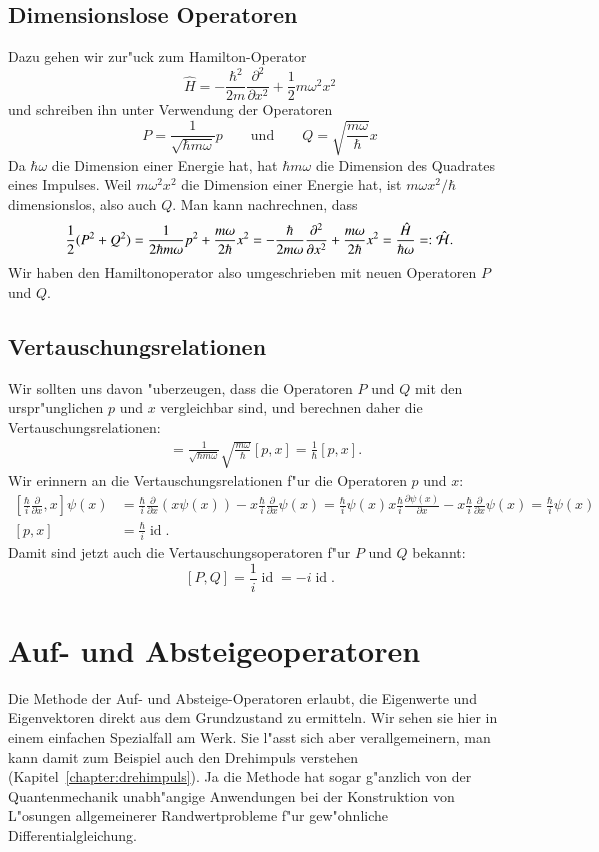 \subsection{Dimensionslose Operatoren}
Dazu gehen wir zur"uck zum Hamilton-Operator
\[
\hat H=-\frac{\hbar^2}{2m}\frac{\partial^2}{\partial x^2}
+\frac12m\omega^2 x^2
\]
und schreiben ihn unter Verwendung der Operatoren
\[
P=\frac{1}{\sqrt{\hbar m\omega}}p 
\qquad
\text{und}
\qquad
Q=\sqrt{\frac{m\omega}{\hbar}}x
\]
Da $\hbar\omega$ die Dimension einer Energie hat, hat $\hbar m\omega$ die
Dimension des Quadrates eines Impulses. Weil $m\omega^2x^2$ die Dimension
einer Energie hat, ist $m\omega x^2/\hbar$ dimensionslos, also auch
$Q$.
Man kann nachrechnen, dass 
\[
\frac12(P^2+Q^2)
=
\frac{1}{2\hbar m \omega}p^2
+
\frac{m\omega}{2\hbar}x^2
=
-\frac{\hbar}{2 m \omega}\frac{\partial^2}{\partial x^2}
+
\frac{m\omega}{2\hbar}x^2
=\frac{\hat H}{\hbar\omega}
=:\hat{\cal H}.
\]
Wir haben den Hamiltonoperator also umgeschrieben mit neuen Operatoren 
$P$ und $Q$.

\subsection{Vertauschungsrelationen}
%
Wir sollten uns davon "uberzeugen, dass die Operatoren $P$ und $Q$ 
mit den urspr"unglichen $p$ und $x$ vergleichbar sind, und berechnen
daher die Vertauschungsrelationen:
\begin{align*}
[P,Q]
&=
\frac{1}{\sqrt{\hbar m\omega}} \sqrt{\frac{m\omega}{\hbar}}[p, x]
=
\frac1{\hbar}[p,x].
\end{align*}
Wir erinnern an die Vertauschungsrelationen f"ur die Operatoren $p$ und $x$:
\begin{align*}
\left[\frac{\hbar}{i}\frac{\partial}{\partial x}, x\right]\psi(x)
&=
\frac{\hbar}{i}\frac{\partial}{\partial x}(x\psi(x))
-x\frac{\hbar}{i}\frac{\partial}{\partial x}\psi(x)
=
\frac{\hbar}{i}\psi(x)
x\frac{\hbar}{i}\frac{\partial \psi(x)}{\partial x}
-x\frac{\hbar}{i}\frac{\partial}{\partial x}\psi(x)
=\frac{\hbar}{i}\psi(x)
\\
[p,x]&=\frac{\hbar}{i}\operatorname{id}.
\end{align*}
Damit sind jetzt auch die Vertauschungsoperatoren f"ur $P$ und $Q$ 
bekannt:
\[
[P,Q]=\frac1{i}\operatorname{id}=-i\operatorname{id}.
\]
%

\section{Auf- und Absteigeoperatoren}
Die Methode der Auf- und Absteige-Operatoren erlaubt, die Eigenwerte
und Eigenvektoren direkt aus dem Grundzustand zu ermitteln.
Wir sehen sie hier in einem einfachen Spezialfall am Werk.
Sie l"asst sich aber verallgemeinern, man kann damit zum Beispiel
auch den Drehimpuls verstehen (Kapitel~\ref{chapter:drehimpuls}).
Ja die Methode hat sogar g"anzlich von der Quantenmechanik unabh"angige
Anwendungen bei der Konstruktion von L"osungen allgemeinerer Randwertprobleme
f"ur gew"ohnliche Differentialgleichung.

